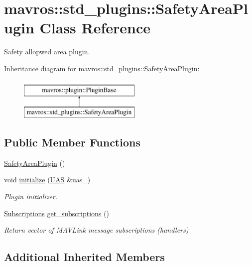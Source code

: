 \hypertarget{classmavros_1_1std__plugins_1_1SafetyAreaPlugin}{}\section{mavros\+::std\+\_\+plugins\+::Safety\+Area\+Plugin Class Reference}
\label{classmavros_1_1std__plugins_1_1SafetyAreaPlugin}


Safety allopwed area plugin.  


Inheritance diagram for mavros\+::std\+\_\+plugins\+::Safety\+Area\+Plugin\+:\begin{figure}[H]
\begin{center}
\leavevmode
\includegraphics[height=2.000000cm]{classmavros_1_1std__plugins_1_1SafetyAreaPlugin}
\end{center}
\end{figure}
\subsection*{Public Member Functions}
\begin{DoxyCompactItemize}
\item 
\mbox{\hyperlink{group__plugin_gacb880f22401f4f72c4a96e421e363b1a}{Safety\+Area\+Plugin}} ()
\item 
void \mbox{\hyperlink{group__plugin_gae1ffa70f4b88baa719fdcc22b7b739b6}{initialize}} (\mbox{\hyperlink{classmavros_1_1UAS}{U\+AS}} \&uas\+\_\+)
\begin{DoxyCompactList}\small\item\em Plugin initializer. \end{DoxyCompactList}\item 
\mbox{\hyperlink{group__plugin_ga8967d61fc77040e0c3ea5a4585d62a09}{Subscriptions}} \mbox{\hyperlink{group__plugin_gade85cfda6dd25076ce1a72955806fe45}{get\+\_\+subscriptions}} ()
\begin{DoxyCompactList}\small\item\em Return vector of M\+A\+V\+Link message subscriptions (handlers) \end{DoxyCompactList}\end{DoxyCompactItemize}
\subsection*{Additional Inherited Members}



